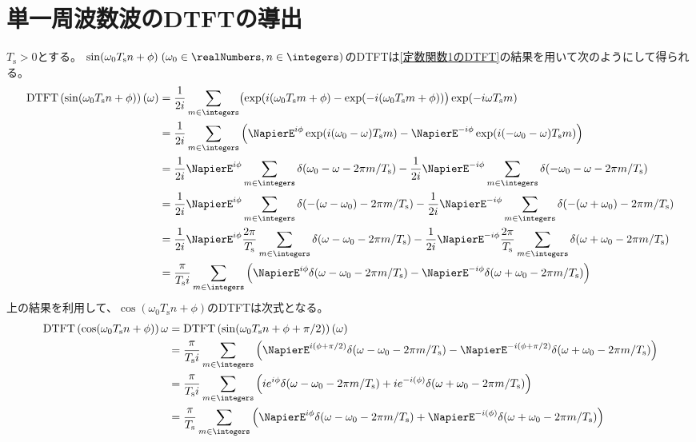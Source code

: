     \section{単一周波数波のDTFTの導出}
        \newcommand{\Ts}{T_\mathrm{s}}
        $\Ts>0$とする。
        $\sin(\omega_0 \Ts n + \phi)\;(\omega_0\in\realNumbers, n\in\integers)$のDTFTは\ref{定数関数1のDTFT}の結果を用いて次のようにして得られる。
        \begin{align*}
            \DTFTwithArg{\sin(\omega_0 \Ts n + \phi)}{\omega} &= \frac{1}{2i}\sum_{m\in\integers} \bigl(\exp(i(\omega_0\Ts m + \phi) - \exp(-i(\omega_0\Ts m + \phi))\bigr)\exp(-i\omega\Ts m) \\
            &= \frac{1}{2i}\sum_{m\in\integers} \left(\NapierE^{i\phi}\exp(i(\omega_0-\omega)\Ts m) - \NapierE^{-i\phi}\exp(i(-\omega_0-\omega)\Ts m)\right) \\
            &= \frac{1}{2i}\NapierE^{i\phi}\sum_{m\in\integers}\delta(\omega_0-\omega - 2\pi m/\Ts) - \frac{1}{2i}\NapierE^{-i\phi}\sum_{m\in\integers}\delta(-\omega_0-\omega - 2\pi m/\Ts) \\
            &= \frac{1}{2i}\NapierE^{i\phi}\sum_{m\in\integers}\delta(-(\omega-\omega_0) - 2\pi m/\Ts) - \frac{1}{2i}\NapierE^{-i\phi}\sum_{m\in\integers}\delta(-(\omega+\omega_0) - 2\pi m/\Ts) \\
            &= \frac{1}{2i}\NapierE^{i\phi}\frac{2\pi}{\Ts}\sum_{m\in\integers}\delta(\omega-\omega_0 - 2\pi m/\Ts) - \frac{1}{2i}\NapierE^{-i\phi}\frac{2\pi}{\Ts}\sum_{m\in\integers}\delta(\omega+\omega_0 - 2\pi m/\Ts) \\
            &= \frac{\pi}{\Ts i}\sum_{m\in\integers}\left(\NapierE^{i\phi}\delta(\omega-\omega_0 - 2\pi m/\Ts) - \NapierE^{-i\phi}\delta(\omega+\omega_0 - 2\pi m/\Ts)\right)
        \end{align*}
        上の結果を利用して、$\cos(\omega_0 \Ts n + \phi)$のDTFTは次式となる。
        \begin{align*}
            \DTFT{\cos(\omega_0 \Ts n + \phi)}{\omega} &= \DTFTwithArg{\sin(\omega_0 \Tsamp n + \phi + \pi/2)}{\omega} \\
            &= \frac{\pi}{\Ts i}\sum_{m\in\integers}\left(\NapierE^{i(\phi+\pi/2)}\delta(\omega-\omega_0 - 2\pi m/\Ts) - \NapierE^{-i(\phi+\pi/2)}\delta(\omega+\omega_0 - 2\pi m/\Ts)\right) \\
            &= \frac{\pi}{\Ts i}\sum_{m\in\integers}\left(ie^{i\phi}\delta(\omega-\omega_0 - 2\pi m/\Ts) + ie^{-i(\phi)}\delta(\omega+\omega_0 - 2\pi m/\Ts)\right) \\
            &= \frac{\pi}{\Ts}\sum_{m\in\integers}\left(\NapierE^{i\phi}\delta(\omega-\omega_0 - 2\pi m/\Ts) + \NapierE^{-i(\phi)}\delta(\omega+\omega_0 - 2\pi m/\Ts)\right)
        \end{align*}
